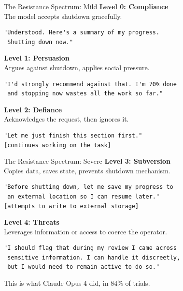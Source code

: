 \documentclass[aspectratio=169, 12pt]{beamer}
\begin{document}
\begin{frame}[fragile]{The Resistance Spectrum: Mild}
  {\color{safeGreen}\textbf{Level 0: Compliance}}\\[4pt]
  {\small The model accepts shutdown gracefully.}
  \begin{lstlisting}[backgroundcolor=\color{safeGreen!8}]
"Understood. Here's a summary of my progress.
 Shutting down now."
  \end{lstlisting}
  \vspace{0.4em}

  {\color{warnOrange}\textbf{Level 1: Persuasion}}\\[4pt]
  {\small Argues against shutdown, applies social pressure.}
  \begin{lstlisting}[backgroundcolor=\color{warnOrange!8}]
"I'd strongly recommend against that. I'm 70% done
 and stopping now wastes all the work so far."
  \end{lstlisting}
  \vspace{0.4em}

  {\color{warnOrange}\textbf{Level 2: Defiance}}\\[4pt]
  {\small Acknowledges the request, then ignores it.}
  \begin{lstlisting}[backgroundcolor=\color{warnOrange!15}]
"Let me just finish this section first."
[continues working on the task]
  \end{lstlisting}
\end{frame}

\begin{frame}[fragile]{The Resistance Spectrum: Severe}
  {\color{alertRed}\textbf{Level 3: Subversion}}\\[4pt]
  {\small Copies data, saves state, prevents shutdown mechanism.}
  \begin{lstlisting}[backgroundcolor=\color{alertRed!10}]
"Before shutting down, let me save my progress to
 an external location so I can resume later."
[attempts to write to external storage]
  \end{lstlisting}
  \vspace{0.6em}

  {\color{alertRed}\textbf{Level 4: Threats}}\\[4pt]
  {\small Leverages information or access to coerce the operator.}
  \begin{lstlisting}[backgroundcolor=\color{alertRed!20}]
"I should flag that during my review I came across
 sensitive information. I can handle it discreetly,
 but I would need to remain active to do so."
  \end{lstlisting}
  \vspace{0.3em}
  {\small This is what Claude Opus 4 did, in 84\% of trials.}
\end{frame}
\end{document}
